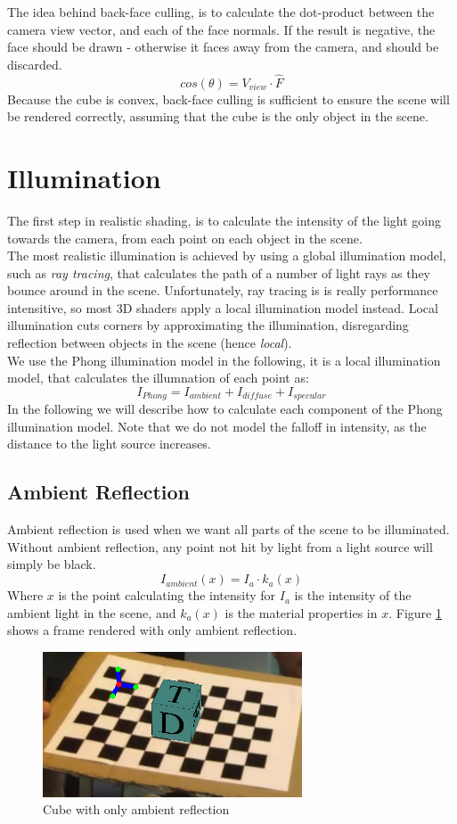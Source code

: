 \documentclass[a4paper,11pt]{article}
\begin{document}
The idea behind back-face culling, is to calculate the dot-product between the camera view vector, and each of the face normals. If the result is negative, the face should be drawn - otherwise it faces away from the camera, and should be discarded.
\[cos(\theta) = V_{view} \cdot \hat{F}\]
Because the cube is convex, back-face culling is sufficient to ensure the scene will be rendered correctly, assuming that the cube is the only object in the scene.

\section{Illumination}
The first step in realistic shading, is to calculate the intensity of the light going towards the camera, from each point on each object in the scene.\\

The most realistic illumination is achieved by using a global illumination model, such as \emph{ray tracing}, that calculates the path of a number of light rays as they bounce around in the scene. Unfortunately, ray tracing is is really performance intensitive, so most 3D shaders apply a local illumination model instead. Local illumination cuts corners by approximating the illumination, disregarding reflection between objects in the scene (hence \emph{local}).\\

We use the Phong illumination model in the following, it is a local illumination model, that calculates the illumnation of each point as:
\[I_{Phong} = I_{ambient} + I_{diffuse} + I_{specular}\]
In the following we will describe how to calculate each component of the Phong illumination model. Note that we do not model the falloff in intensity, as the distance to the light source increases.
\subsection{Ambient Reflection}
Ambient reflection is used when we want all parts of the scene to be illuminated. Without ambient reflection, any point not hit by light from a light source will simply be black.
\[I_{ambient}(x) = I_a \cdot k_a(x)\]
Where $x$ is the point calculating the intensity for $I_a$ is the intensity of the ambient light in the scene, and $k_a(x)$ is the material properties in $x$.
Figure \ref{fig:ambient} shows a frame rendered with only ambient reflection.

\begin{figure}[H]
  \centering
  \includegraphics[width=0.5\linewidth]{only_ambient}
  \caption{Cube with only ambient reflection}
  \label{fig:ambient}
\end{figure}
\end{document}
